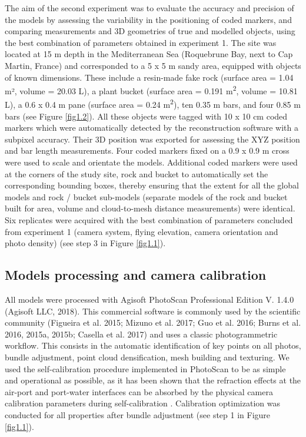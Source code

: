 The aim of the second experiment was to evaluate the accuracy and precision of the models by assessing the variability in the positioning of coded markers, and comparing measurements and 3D geometries of true and modelled objects, using the best combination of parameters obtained in experiment 1. The site was located at 15 m depth in the Mediterranean Sea (Roquebrune Bay, next to Cap Martin, France) and corresponded to a 5 x 5 m sandy area, equipped with objects of known dimensions. These include a resin-made fake rock (surface area = 1.04 m², volume = 20.03 L), a plant bucket (surface area = 0.191 m\textsuperscript{2}, volume = 10.81 L), a 0.6 x 0.4 m pane (surface area = 0.24 m\textsuperscript{2}), ten 0.35 m bars, and four 0.85 m bars (see Figure \ref{fig1.2}). All these objects were tagged with 10 x 10 cm coded markers which were automatically detected by the reconstruction software with a subpixel accuracy. Their 3D position was exported for assessing the XYZ position and bar length measurements. Four coded markers fixed on a 0.9 x 0.9 m cross were used to scale and orientate the models. Additional coded markers were used at the corners of the study site, rock and bucket to automatically set the corresponding bounding boxes, thereby ensuring that the extent for all the global models and rock / bucket sub-models (separate models of the rock and bucket built for area, volume and cloud-to-mesh distance measurements) were identical. Six replicates were acquired with the best combination of parameters concluded from experiment 1 (camera system, flying elevation, camera orientation and photo density) (see step 3 in Figure \ref{fig1.1}).

\subsection{Models processing and camera calibration}\label{chapitre1_2.2}
All models were processed with Agisoft PhotoScan Professional Edition V. 1.4.0 (Agisoft LLC, 2018). This commercial software is commonly used by the scientific community (Figueira et al. 2015; Mizuno et al. 2017; Guo et al. 2016; Burns et al. 2016, 2015a, 2015b; Casella et al. 2017) and uses a classic photogrammetric workflow. This consists in the automatic identification of key points on all photos, bundle adjustment, point cloud densification, mesh building and texturing. We used the self-calibration procedure implemented in PhotoScan to be as simple and operational as possible, as it has been shown that the refraction effects at the air-port and port-water interfaces can be absorbed by the physical camera calibration parameters during self-calibration \citep{shortis_calibration_2015}. Calibration optimization was conducted for all properties after bundle adjustment (see step 1 in Figure \ref{fig1.1}).
\medskip

